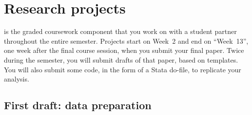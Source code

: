 \chapter{Research projects}%
	\label{ch:paper}

 is the graded coursework component that you work on with a student partner throughout the entire semester. Projects start on Week~2 and end on ``Week~13'', one week after the final course session, when you submit your final paper. Twice during the semester, you will submit drafts of that paper, based on templates. You will also submit some code, in the form of a Stata do-file, to replicate your analysis.





\section*{First draft: data preparation}


